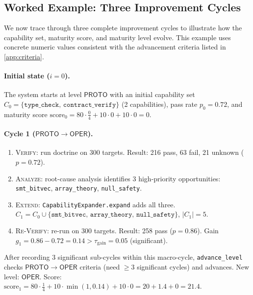 \documentclass[11pt]{article}
\newcommand{\score}{\mathrm{score}}         %
\newcommand{\Proto}{\ensuremath{\mathsf{PROTO}}}
\newcommand{\Oper}{\ensuremath{\mathsf{OPER}}}
\newcommand{\Verify}{\textsc{Verify}}
\newcommand{\Analyze}{\textsc{Analyze}}
\newcommand{\Extend}{\textsc{Extend}}
\newcommand{\ReVerify}{\textsc{Re-Verify}}
\newcommand{\gainT}{\tau_{\mathrm{gain}}}
\begin{document}
\subsection{Worked Example: Three Improvement Cycles}\label{sec:worked}

We now trace through three complete improvement cycles to illustrate how
the capability set, maturity score, and maturity level evolve.  This
example uses concrete numeric values consistent with the advancement
criteria listed in \cref{app:criteria}.

\paragraph{Initial state ($i = 0$).}
The system starts at level $\Proto$ with an initial capability set
$C_0 = \{\texttt{type\_check},\, \texttt{contract\_verify}\}$
(2 capabilities), pass rate $p_0 = 0.72$, and maturity score
$\score_0 = 80 \cdot \tfrac{0}{4} + 10 \cdot 0 + 10 \cdot 0 = 0$.

\paragraph{Cycle 1 ($\Proto \to \Oper$).}
\begin{enumerate}
  \item \Verify{}: run doctrine on 300 targets. Result: 216 pass, 63 fail,
    21 unknown ($p = 0.72$).
  \item \Analyze{}: root-cause analysis identifies 3 high-priority
    opportunities: \texttt{smt\_bitvec}, \texttt{array\_theory},
    \texttt{null\_safety}.
  \item \Extend{}: \texttt{CapabilityExpander.expand} adds all three.
    $C_1 = C_0 \cup \{\texttt{smt\_bitvec},\,\texttt{array\_theory},\,
    \texttt{null\_safety}\}$, $|C_1| = 5$.
  \item \ReVerify{}: re-run on 300 targets. Result: 258 pass ($p = 0.86$).
    Gain $g_1 = 0.86 - 0.72 = 0.14 > \gainT = 0.05$ (significant).
\end{enumerate}
After recording 3 significant sub-cycles within this macro-cycle,
\texttt{advance\_level} checks $\Proto \to \Oper$ criteria (need $\geq 3$
significant cycles) and advances.  New level: $\Oper$.  Score:
$\score_1 = 80 \cdot \tfrac{1}{4} + 10 \cdot \min(1, 0.14)
           + 10 \cdot 0 = 20 + 1.4 + 0 = 21.4$.
\end{document}
